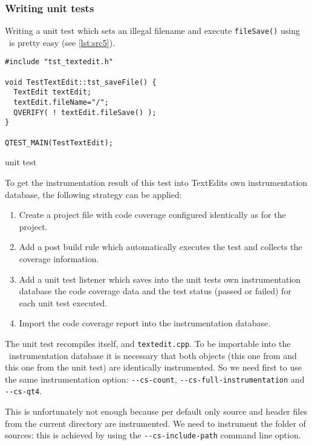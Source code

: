 \subsubsection{Writing unit tests}

Writing a unit test which sets an illegal filename and execute \verb$fileSave()$ using
\QTestLib\ is pretty easy (see \autoref{lst:src5}).

\begin{listings}[H]
  \scriptsize
\begin{verbatim}
#include "tst_textedit.h"

void TestTextEdit::tst_saveFile() {
  TextEdit textEdit;
  textEdit.fileName="/";
  QVERIFY( ! textEdit.fileSave() );
}

QTEST_MAIN(TestTextEdit);
\end{verbatim}
\caption{{\TextEdit} unit test}
\label{lst:src5}
\end{listings}

To get the instrumentation result of this test into TextEdits own
instrumentation database, the following strategy can be applied:
\begin{enumerate}
  \item Create a {\qmake} project file with code coverage configured identically as for the {\TextEdit}
    project. 
  \item Add a post build rule which automatically executes the test and collects
    the coverage information.
  \item Add a unit test listener which saves into the unit tests own instrumentation database
    the code coverage data and the test status (passed or failed) for each unit test executed.
  \item Import the code coverage report into the {\TextEdit} instrumentation database.
\end{enumerate}

The unit test recompiles itself, and \texttt{textedit.cpp}. To be importable into the \TextEdit\
instrumentation database it is necessary that both  objects (this one from
{\TextEdit} and this one from the unit test) are  identically instrumented.
So we need first to use the same instrumentation option: \verb$--cs-count$,
\verb$--cs-full-instrumentation$ and \verb$--cs-qt4$.

This is unfortunately not enough because per default only source and header
files from the current directory are instrumented. We need to instrument the folder of
{\TextEdit} sources: this is achieved by using the \verb$--cs-include-path$ command line option.

